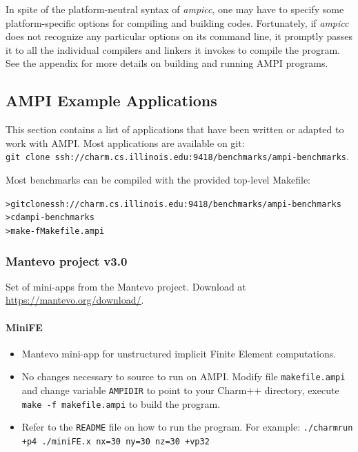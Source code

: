 \documentclass[10pt]{article}
\begin{document}
In spite of the platform-neutral syntax of \emph{ampicc}, one may have to specify
some platform-specific options for compiling and building \ampi{} codes.
Fortunately, if \emph{ampicc} does not recognize any particular options on its
command line, it promptly passes it to all the individual compilers and linkers
it invokes to compile the program. See the appendix for more details on
building and running AMPI programs.

\subsection{AMPI Example Applications}
\label{adaptive-mpi-ampi-codes}

This section contains a list of applications that have
been written or adapted to work with AMPI.
Most applications are available on git:\\ \texttt{git clone ssh://charm.cs.illinois.edu:9418/benchmarks/ampi-benchmarks}.

Most benchmarks can be compiled with the provided top-level Makefile:

\begin{alltt}
	> git clone ssh://charm.cs.illinois.edu:9418/benchmarks/ampi-benchmarks
	> cd ampi-benchmarks
	> make -f Makefile.ampi
\end{alltt}

\subsubsection{Mantevo project v3.0}

Set of mini-apps from the Mantevo project. Download at \url{https://mantevo.org/download/}.

\paragraph{MiniFE}
    \begin{itemize}
    \item
      Mantevo mini-app for unstructured implicit Finite Element
      computations.
    \item
      No changes necessary to source to run on AMPI. Modify
      file \texttt{makefile.ampi} and change variable \texttt{AMPIDIR} to point to
      your Charm++ directory, execute \texttt{make -f makefile.ampi} to
      build the program.
    \item
      Refer to the \texttt{README} file on how to run the program. For
      example: \texttt{./charmrun +p4 ./miniFE.x nx=30 ny=30 nz=30 +vp32}
    \end{itemize}
\end{document}
